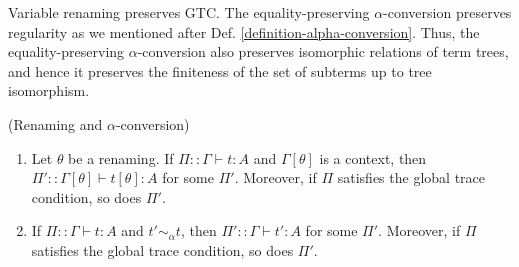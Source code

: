 
Variable renaming preserves GTC.
The equality-preserving $\alpha$-conversion preserves regularity as we mentioned
after Def. \ref{definition-alpha-conversion}. 
Thus, the equality-preserving $\alpha$-conversion also preserves isomorphic relations of term trees, 
and hence it preserves the finiteness of the set of subterms up to tree isomorphism.

\begin{proposition}(Renaming and $\alpha$-conversion)
\label{prop:renaming}
  \begin{enumerate}
  \item\label{prop:renaming1}
    Let $\theta$ be a renaming.
    If $\Pi::\Gamma\vdash t:A$ and $\Gamma[\theta]$ is a context, 
    then $\Pi'::\Gamma[\theta]\vdash t[\theta]:A$ for some $\Pi'$.
    Moreover, if $\Pi$ satisfies the global trace condition, so does $\Pi'$.
  \item\label{prop:renaming2}
    If $\Pi::\Gamma\vdash t:A$ and $t' \sim_\alpha t$,
    then $\Pi'::\Gamma\vdash t':A$ for some $\Pi'$.
    Moreover, if $\Pi$ satisfies the global trace condition, so does $\Pi'$.
  \end{enumerate}
\end{proposition}


